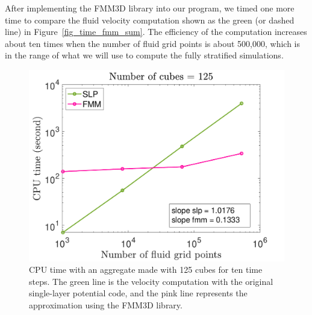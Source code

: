 After implementing the FMM3D library into our program, we timed one more time to compare the fluid velocity computation shown as the green (or dashed line) in Figure~\ref{fig_time_fmm_sum}. The efficiency of the computation increases about ten times when the number of fluid grid points is about 500,000, which is in the range of what we will use to compute the fully stratified simulations.
\begin{figure}[ht]
	\begin{center}
		\includegraphics[scale=0.4]{./figures/fig_time_both_mm5_Nt10}
	\caption{CPU time with an aggregate made with 125 cubes for ten time steps. The green line is the velocity computation with the original single-layer potential code, and the pink line represents the approximation using the FMM3D library.}
	\label{fig_vel_mm5_t1}
\end{center}
\end{figure}

